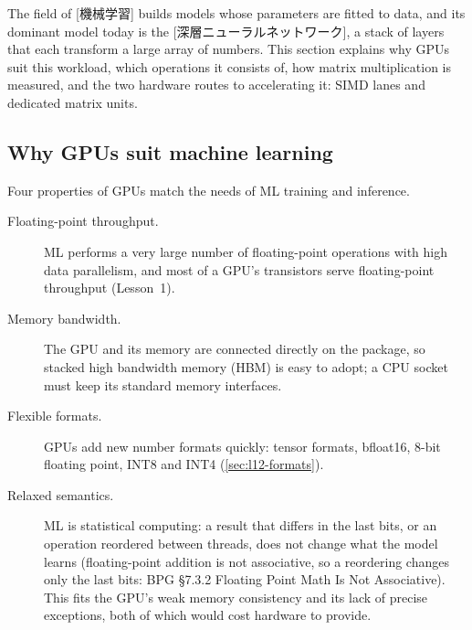\documentclass[../main.tex]{subfiles}
\begin{document}
The field of [機械学習] builds models whose
parameters are fitted to data, and its dominant model today is the
[深層ニューラルネットワーク], a stack of
layers that each transform a large array of numbers.  This section explains why
GPUs suit this workload, which operations it consists of, how
matrix multiplication is measured, and the two hardware routes to
accelerating it: SIMD lanes and dedicated matrix units.

\subsection{Why GPUs suit machine learning}

Four properties of GPUs match the needs of ML training and inference.
\begin{description}
  \item[Floating-point throughput.]  ML performs a very large number of
    floating-point operations with high data parallelism, and most of a
    GPU's transistors serve floating-point throughput (Lesson~1).
  \item[Memory bandwidth.]  The GPU and its memory are connected
    directly on the package, so stacked high bandwidth memory (HBM) is
    easy to adopt; a CPU socket must keep its standard memory
    interfaces.
  \item[Flexible formats.]  GPUs add new number formats quickly: tensor
    formats, bfloat16, 8-bit floating point, INT8 and INT4
    (\cref{sec:l12-formats}).
  \item[Relaxed semantics.]  ML is statistical computing: a result
    that differs in the last bits, or an operation reordered between
    threads, does not change what the model learns (floating-point
    addition is not associative, so a reordering changes only the last
    bits: BPG §7.3.2 Floating Point Math Is Not Associative).  This fits the GPU's
    weak memory consistency and its lack of precise exceptions,
    both of which would cost hardware to
    provide.
\end{description}
\end{document}
